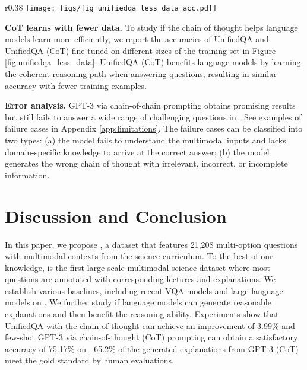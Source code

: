 \begin{wrapfigure}{r}{0.38\textwidth}
\centering
 \vspace{-4.5mm}
 \texttt{[image: figs/fig\_unifiedqa\_less\_data\_acc.pdf]}
 \caption{UnifiedQA (CoT) learns efficiently with fewer training examples.}
 \vspace{-6.0mm}
 \label{fig:unifiedqa_less_data}
\end{wrapfigure}


\textbf{CoT learns with fewer data.}  To study if the chain of thought helps language models learn more efficiently, we report the accuracies of UnifiedQA and UnifiedQA (CoT) fine-tuned on different sizes of the training set in Figure \ref{fig:unifiedqa_less_data}. UnifiedQA (CoT) benefits language models by learning the coherent reasoning path when answering questions, resulting in similar accuracy with fewer training examples.

\textbf{Error analysis.} GPT-3 via chain-of-chain prompting obtains promising results but still fails to answer a wide range of challenging questions in \name{}. See examples of failure cases in Appendix \ref{app:limitations}. The failure cases can be classified into two types: (a) the model fails to understand the multimodal inputs and lacks domain-specific knowledge to arrive at the correct answer; (b) the model generates the wrong chain of thought with irrelevant, incorrect, or incomplete information.


\vspace{-2mm}
\section{Discussion and Conclusion}
\vspace{-2mm}

In this paper, we propose \name{}, a dataset that features 21,208 multi-option questions with multimodal contexts from the science curriculum. To the best of our knowledge, \name{} is the first large-scale multimodal science dataset where most questions are annotated with corresponding lectures and explanations. We establish various baselines, including recent VQA models and large language models on \name{}. We further study if language models can generate reasonable explanations and then benefit the reasoning ability. Experiments show that UnifiedQA with the chain of thought can achieve an improvement of 3.99\% and few-shot GPT-3 via chain-of-thought (CoT) prompting can obtain a satisfactory accuracy of 75.17\% on \name{}. 65.2\% of the generated explanations from GPT-3 (CoT) meet the gold standard by human evaluations.



